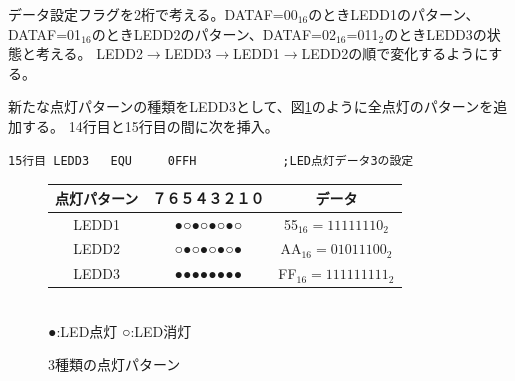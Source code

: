 \documentclass[a4paper,12pt]{ujarticle}
\begin{document}
       データ設定フラグを2桁で考える。DATAF=00$_{16}$のときLEDD1のパターン、DATAF=01$_{16}$のときLEDD2のパターン、DATAF=02$_{16}$=011$_2$のときLEDD3の状態と考える。
       LEDD2$\to$LEDD3$\to$LEDD1$\to$LEDD2の順で変化するようにする。

       新たな点灯パターンの種類をLEDD3として、図\ref{fig:timer-LED3pattern}のように全点灯のパターンを追加する。
14行目と15行目の間に次を挿入。
      \begin{lstlisting}[basicstyle=\ttfamily\footnotesize, frame=single]
15行目 LEDD3   EQU     0FFH            ;LED点灯データ3の設定
      \end{lstlisting}

   \begin{figure}[htbp]
    \begin{center}
       \begin{tabular}{c|c|c}\hline
点灯パターン&７６５４３２１０ & データ \\ \hline
      LEDD1 &●○●○●○●○ & 55$_{16}=11111110_2$ \\
      LEDD2 &○●○●○●○● & AA$_{16}=01011100_2$ \\
      LEDD3 &●●●●●●●● & FF$_{16}=111111111_2$\\ \hline
       \end{tabular}\\
      ●:LED点灯 ○:LED消灯
    \end{center}
    \caption{3種類の点灯パターン}
    \label{fig:timer-LED3pattern}
\end{figure}
\end{document}
